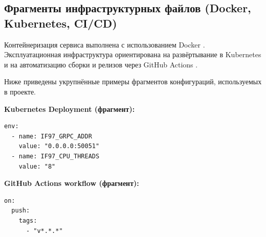 \begin{appendices}
\section{Фрагменты инфраструктурных файлов (Docker, Kubernetes, CI/CD)}

Контейнеризация сервиса выполнена с использованием Docker \cite{docker_docs}.  
Эксплуатационная инфраструктура ориентирована на развёртывание в Kubernetes \cite{kubernetes_docs} и на автоматизацию сборки и релизов через GitHub Actions \cite{github_actions_docs}.  

Ниже приведены укрупнённые примеры фрагментов конфигураций, используемых в проекте.  

\textbf{Kubernetes Deployment (фрагмент):}
\begin{verbatim}
env:
  - name: IF97_GRPC_ADDR
    value: "0.0.0.0:50051"
  - name: IF97_CPU_THREADS
    value: "8"
\end{verbatim}

\textbf{GitHub Actions workflow (фрагмент):}
\begin{verbatim}
on:
  push:
    tags:
      - "v*.*.*"
\end{verbatim}

\end{appendices}
